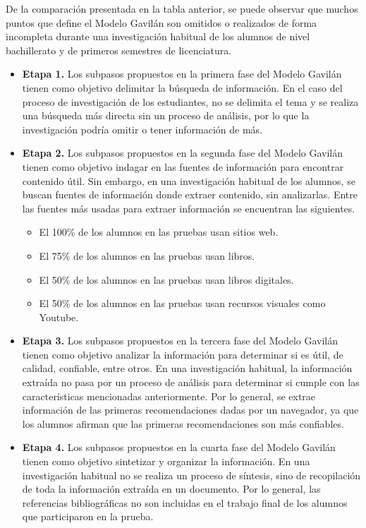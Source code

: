 De la comparación presentada en la tabla anterior, se puede observar que muchos puntos que define el Modelo Gavilán son omitidos o realizados de forma incompleta durante una investigación habitual de los alumnos de nivel bachillerato y de primeros semestres de licenciatura.

\begin{itemize}
  \item \textbf{Etapa 1.} Los subpasos propuestos en la primera fase del Modelo Gavilán tienen como objetivo delimitar la búsqueda de información. En el caso del proceso de investigación de los estudiantes, no se delimita el tema y se realiza una búsqueda más directa sin un proceso de análisis, por lo que la investigación podría omitir o tener información de más.
  \item \textbf{Etapa 2.} Los subpasos propuestos en la segunda fase del Modelo Gavilán tienen como objetivo indagar en las fuentes de información para encontrar contenido útil. Sin embargo, en una investigación habitual de los alumnos, se buscan fuentes de información donde extraer contenido, sin analizarlas. Entre las fuentes más usadas para extraer información se encuentran las siguientes.
  \begin{itemize}
    \item El 100\% de los alumnos en las pruebas usan sitios web.
    \item El 75\% de los alumnos en las pruebas usan libros.
    \item El 50\% de los alumnos en las pruebas usan libros digitales.
    \item El 50\% de los alumnos en las pruebas usan recursos visuales como Youtube.
  \end{itemize}
  \item \textbf{Etapa 3.} Los subpasos propuestos en la tercera fase del Modelo Gavilán tienen como objetivo analizar la información para determinar si es útil, de calidad, confiable, entre otros. En una investigación habitual, la información extraída no pasa por un proceso de análisis para determinar si cumple con las características mencionadas anteriormente. Por lo general, se extrae información de las primeras recomendaciones dadas por un navegador, ya que los alumnos afirman que las primeras recomendaciones son más confiables.
  \item \textbf{Etapa 4.} Los subpasos propuestos en la cuarta fase del Modelo Gavilán tienen como objetivo sintetizar y organizar la información. En una investigación habitual no se realiza un proceso de síntesis, sino de recopilación de toda la información extraída en un documento. Por lo general, las referencias bibliográficas no son incluidas en el trabajo final de los alumnos que participaron en la prueba.
\end{itemize}

